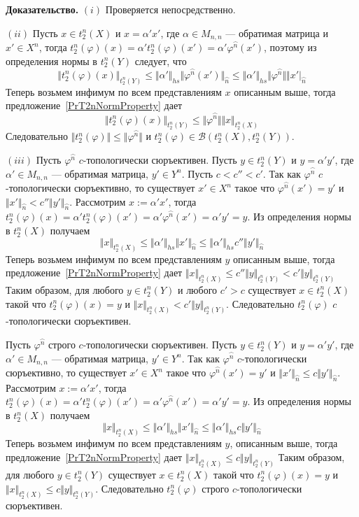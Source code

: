 \documentclass[12pt]{article}
\begin{document}
{\bf Доказательство.} $(i)$ Проверяется непосредственно. 

$(ii)$ Пусть $x\in t_2^n(X)$ и $x=\alpha'x'$, где $\alpha\in M_{n,n}$ ---
обратимая матрица и $x'\in X^{n}$, тогда
$t_2^n(\varphi)(x)=\alpha't_2^n(\varphi)(x')=\alpha'\varphi^{\wideparen{n}}(x')$,
поэтому из определения нормы в $t_2^n(Y)$ следует, что
$$
\Vert t_2^n(\varphi)(x)\Vert_{t_2^n(Y)}
\leq\Vert\alpha'\Vert_{hs}\Vert\varphi^{\wideparen{n}}(x')\Vert_{\wideparen{n}}
\leq\Vert\alpha'\Vert_{hs}
\Vert\varphi^{\wideparen{n}}\Vert\Vert x'\vert_{\wideparen{n}}
$$
Теперь возьмем инфимум по всем представлениям $x$ описанным выше, тогда
предложение~\ref{PrT2nNormProperty} дает
$$
\Vert t_2^n(\varphi)(x)\Vert_{t_2^n(Y)}
\leq\Vert\varphi^{\wideparen{n}}\Vert\Vert x\Vert_{t_2^n(X)}
$$
Следовательно $\Vert t_2^n(\varphi)\Vert\leq\Vert\varphi^{\wideparen{n}}\Vert$ и
$t_2^n(\varphi)\in\mathcal{B}(t_2^n(X),t_2^n(Y))$.

$(iii)$ Пусть $\varphi^{\wideparen{n}}$  $c$-топологически сюръективен. Пусть
$y\in t_2^n(Y)$ и $y=\alpha' y'$, где $\alpha'\in M_{n,n}$ --- обратимая
матрица, $y'\in Y^n$. Пусть $c<c''<c'$. Так как $\varphi^{\wideparen{n}}$
$c$-топологически сюръективно, то существует $x'\in X^n$ такое что
$\varphi^{\wideparen{n}}(x')=y'$ и $\Vert x'\Vert_{\wideparen{n}}< c''\Vert
y'\Vert_{\wideparen{n}}$. Рассмотрим $x:=\alpha'x'$, тогда
$t_2^n(\varphi)(x)=\alpha't_2^n(\varphi)(x')
=\alpha'\varphi^{\wideparen{n}}(x')=\alpha'
y'=y$. Из определения нормы в $t_2^n(X)$ получаем
$$
\Vert x\Vert_{t_2^n(X)}
\leq\Vert\alpha'\Vert_{hs}\Vert x'\Vert_{\wideparen{n}}
\leq\Vert\alpha'\Vert_{hs} c''\Vert y'\Vert_{\wideparen{n}}
$$
Теперь возьмем инфимум по всем представлениям $y$ описанным выше, тогда
предложение~\ref{PrT2nNormProperty} дает $\Vert x\Vert_{t_2^n(X)}\leq c''\Vert
y\Vert_{t_2^n(Y)}<c'\Vert y\Vert_{t_2^n(Y)}$ Таким образом, для любого $y\in
t_2^n(Y)$ и любого $c'>c$ существует $x\in t_2^n(X)$ такой что
$t_2^n(\varphi)(x)=y$ и $\Vert x\Vert_{t_2^n(X)}< c'\Vert y\Vert_{t_2^n(Y)}$.
Следовательно $t_2^n(\varphi)$ $c$-топологически сюръективен.

Пусть $\varphi^{\wideparen{n}}$ строго $c$-топологически сюръективен. Пусть
$y\in t_2^n(Y)$ и $y=\alpha' y'$, где $\alpha'\in M_{n,n}$ --- обратимая
матрица, $y'\in Y^n$. Так как $\varphi^{\wideparen{n}}$ $c$-топологически
сюръективно, то существует $x'\in X^n$ такое что
$\varphi^{\wideparen{n}}(x')=y'$ и $\Vert x'\Vert_{\wideparen{n}}\leq c\Vert
y'\Vert_{\wideparen{n}}$. Рассмотрим $x:=\alpha'x'$, тогда
$t_2^n(\varphi)(x)=\alpha't_2^n(\varphi)(x')
=\alpha'\varphi^{\wideparen{n}}(x')=\alpha'y'=y$. 
Из определения нормы в $t_2^n(X)$ получаем
$$
\Vert x\Vert_{t_2^n(X)}
\leq\Vert\alpha'\Vert_{hs}\Vert x'\Vert_{\wideparen{n}}
\leq\Vert\alpha'\Vert_{hs} c\Vert y'\Vert_{\wideparen{n}}
$$
Теперь возьмем инфимум по всем представлениям $y$, описанным выше, тогда
предложение~\ref{PrT2nNormProperty} дает $\Vert x\Vert_{t_2^n(X)}\leq c\Vert
y\Vert_{t_2^n(Y)}$ Таким образом, для любого $y\in t_2^n(Y)$ существует $x\in
t_2^n(X)$ такой что $t_2^n(\varphi)(x)=y$ и $\Vert x\Vert_{t_2^n(X)}\leq c\Vert
y\Vert_{t_2^n(Y)}$. Следовательно $t_2^n(\varphi)$ строго $c$-топологически
сюръективен.
\end{document}
